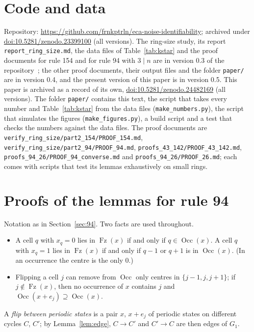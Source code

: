 \documentclass[10pt,a4paper]{article}
\newcommand{\Gone}{G_1}                       %
\newcommand{\Occ}{\operatorname{Occ}}         %
\newcommand{\Fz}{\operatorname{Fz}}           %
\begin{document}
\begin{sloppypar}
\section*{Code and data}
\raggedright
Repository: \url{https://github.com/frnkptrln/eca-noise-identifiability}; archived under
\href{https://doi.org/10.5281/zenodo.23399100}{doi:10.5281/zenodo.23399100} (all versions). The ring-size study, its report
\texttt{report\_ring\_size.md}, the data files of Table~\ref{tab:kstar} and the proof documents for rule 154 and
for rule 94 with $3\mid n$ are in version 0.3 of the repository~\cite{PeterleinStudy}; the other proof documents, their
output files and the folder \texttt{paper/} are in version 0.4, and the present version of this paper is in
version 0.5. This paper is archived as a record of its own,
\href{https://doi.org/10.5281/zenodo.24482169}{doi:10.5281/zenodo.24482169} (all versions). The folder \texttt{paper/} contains
this text, the script that takes every number and Table~\ref{tab:kstar} from the data files
(\texttt{make\_numbers.py}), the script that simulates the figures (\texttt{make\_figures.py}), a build script and
a test that checks the numbers against the data files. The proof documents are
\texttt{verify\_ring\_size/part2\_154/PROOF\_154.md}, \texttt{verify\_ring\_size/part2\_94/PROOF\_94.md},
\texttt{proofs\_43\_142/PROOF\_43\_142.md}, \texttt{proofs\_94\_26/PROOF\_94\_converse.md} and
\texttt{proofs\_94\_26/PROOF\_26.md}; each comes with scripts that test its lemmas exhaustively on small rings.
\end{sloppypar}




\appendix

\section{Proofs of the lemmas for rule 94}\label{app:94}

Notation as in Section~\ref{sec:94}. Two facts are used throughout.
\begin{itemize}[leftmargin=*,nosep]
\item[(O1)] A cell $q$ with $x_q=0$ lies in $\Fz(x)$ if and only if $q\in\Occ(x)$. A cell $q$ with $x_q=1$ lies in
$\Fz(x)$ if and only if $q-1$ or $q+1$ is in $\Occ(x)$. (In an occurrence the centre is the only $0$.)
\item[(O2)] Flipping a cell $j$ can remove from $\Occ$ only centres in $\{j-1,j,j+1\}$; if $j\notin\Fz(x)$, then no
occurrence of $x$ contains $j$ and $\Occ(x+e_j)\supseteq\Occ(x)$.
\end{itemize}
A \emph{flip between periodic states} is a pair $x$, $x+e_j$ of periodic states on different cycles $C$, $C'$; by
Lemma~\ref{lem:edge}, $C\to C'$ and $C'\to C$ are then edges of $\Gone$.
\end{document}
